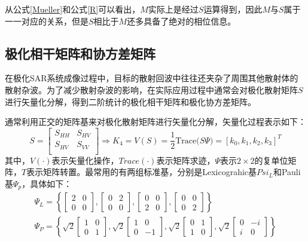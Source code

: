 \documentclass[promaster]{thesis-uestc}
\begin{document}
从公式\ref{Mueller}和公式\ref{R}可以看出，$M$实际上是经过$S$运算得到，因此$M$与$S$属于一一对应的关系，但是$S$相比于$M$还多具备了绝对的相位信息。

\subsection{极化相干矩阵和协方差矩阵}
在极化SAR系统成像过程中，目标的散射回波中往往还夹杂了周围其他散射体的散射杂波。为了减少散射杂波的影响，在实际应用过程中通常会对极化散射矩阵$S$进行矢量化分解，得到二阶统计的极化相干矩阵和极化协方差矩阵。

通常利用正交的矩阵基来对极化散射矩阵进行矢量化分解，矢量化过程表示如下：
\begin{equation}
    S=\left[ \begin{matrix}
            S_{HH} & S_{HV} \\
            S_{HV} & S_{VV} \\
        \end{matrix} \right] \Rightarrow K_4=V(S)=\frac{1}{2}\mathrm{Trace(}S\Psi )=\left[ k_0,k_1,k_2,k_3 \right] ^T
\end{equation}
其中，$V(\cdot)$表示矢量化操作，$Trace(\cdot)$表示矩阵求迹，$\Psi$表示$2\times2$的复单位矩阵，$T$表示矩阵转置。最常用的有两组标准基，分别是Lexicograhic基$Psi_L$和Pauli基$\Psi_p$，具体如下：
\begin{gather}
    \Psi_L=\left\{\left[\begin{array}{ll}
            2 & 0 \\
            0 & 0
        \end{array}\right],\left[\begin{array}{ll}
            0 & 2 \\
            0 & 0
        \end{array}\right],\left[\begin{array}{ll}
            0 & 0 \\
            2 & 0
        \end{array}\right],\left[\begin{array}{ll}
            0 & 0 \\
            0 & 2
        \end{array}\right]\right\}                                    \\
    \Psi_P=\left\{\sqrt{2}\left[\begin{array}{ll}
            1 & 0 \\
            0 & 1
        \end{array}\right], \sqrt{2}\left[\begin{array}{cc}
            1 & 0  \\
            0 & -1
        \end{array}\right], \sqrt{2}\left[\begin{array}{ll}
            0 & 1 \\
            1 & 0
        \end{array}\right], \sqrt{2}\left[\begin{array}{cc}
            0 & -i \\
            i & 0
        \end{array}\right]\right\}
\end{gather}
\end{document}
